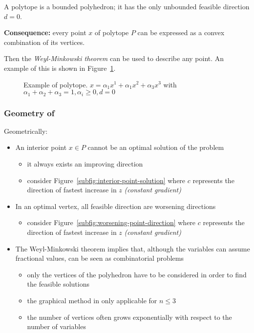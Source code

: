 \documentclass[english]{article}
\begin{document}
\bigskip
A polytope is a bounded polyhedron; it has the only unbounded feasible direction \(d = 0\).

\textbf{Consequence:}
every point \(x\) of polytope \(P\) can be expressed as a convex combination of its vertices.

Then the \textit{Weyl-Minkowski theorem} can be used to describe any point.
An example of this is shown in Figure~\ref{fig:polytope-example}.

\begin{figure}[htbp]
  \bigskip
  \centering
  \caption{Example of polytope. \(x = \alpha_1 x^1 + \alpha_1 x^2 + \alpha_3 x^3\) with \(\alpha_1 + \alpha_2 + \alpha_3 = 1, \alpha_i \geq 0, d = 0\)}
  \label{fig:polytope-example}
  \bigskip
\end{figure}

\subsubsection{Geometry of \LP}

Geometrically:

\begin{itemize}
  \item An interior point \(x \in P\) cannot be an optimal solution of the problem
        \begin{itemize}
          \item it always exists an improving direction
          \item consider Figure~\ref{subfig:interior-point-solution} where \(c\) represents the direction of fastest increase in \(z\) \textit{(constant gradient)}
        \end{itemize}
  \item In an optimal vertex, all feasible direction are worsening directions
        \begin{itemize}
          \item consider Figure~\ref{subfig:worsening-point-direction} where \(c\) represents the direction of fastest increase in \(z\) \textit{(constant gradient)}
        \end{itemize}
  \item The Weyl-Minkowski theorem implies that, although the variables can assume fractional values, \LP can be seen as combinatorial problems
        \begin{itemize}
          \item only the vertices of the polyhedron have to be considered in order to find the feasible solutions
          \item the graphical method in only applicable for \(n \leq 3\)
          \item the number of vertices often grows exponentially with respect to the number of variables
        \end{itemize}
\end{itemize}
\end{document}

